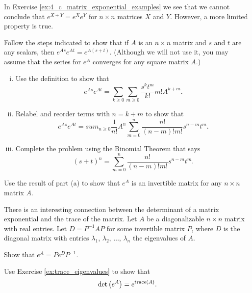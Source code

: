 \ea

\item In Exercise \ref{ex:4_c_matrix_exponential_examples} we see that we cannot conclude that $e^{X+Y} = e^X e^Y$ for $n \times n$ matrices $X$ and $Y$. However, a more limited property is true. 
\ba
\item  Follow the steps indicated to show that if $A$ is an $n \times n$ matrix and $s$ and $t$ are any scalars, then $e^{As} e^{At} = e^{A(s+t)}$. (Although we will not use it, you may assume that the series for $e^A$ converges for any square matrix $A$.) 
	\begin{enumerate}[i.]
	\item Use the definition to show that 
	\[e^{As}e^{At} = \sum_{k \geq 0} \sum_{m \geq 0} \frac{s^kt^m}{k!}m! A^{k+m}.\]
	\item Relabel and reorder terms with $n = k+m$ to show that
	\[e^{As}e^{At} = sum_{n \geq 0} \frac{1}{n!} A^n \sum_{m = 0}^n \frac{n!}{(n-m)!m!} s^{n-m}t^m.\]
	\item Complete the problem using the Binomial Theorem that says \[(s+t)^n =  \sum_{m = 0}^n \frac{n!} {(n-m)!m!} s^{n-m}t^m.\]
	\end{enumerate}

\item Use the result of part (a) to show that $e^A$ is an invertible matrix for any $n \times n$ matrix $A$. 

\ea


\item There is an interesting connection between the determinant of a matrix exponential and the trace of the matrix. 
Let $A$ be a diagonalizable $n \times n$ matrix with real entries. Let $D = P^{-1}AP$ for some invertible matrix $P$, where $D$ is the diagonal matrix with entries $\lambda_1$, $\lambda_2$, $\ldots$, $\lambda_n$ the eigenvalues of $A$.
\ba
\item  Show that $e^A = Pe^DP^{-1}$.

\item Use Exercise \ref{ex:trace_eigenvalues} to show that 
\[\det\left(e^A\right) = e^{\text{trace}(A)}.\]

\ea

